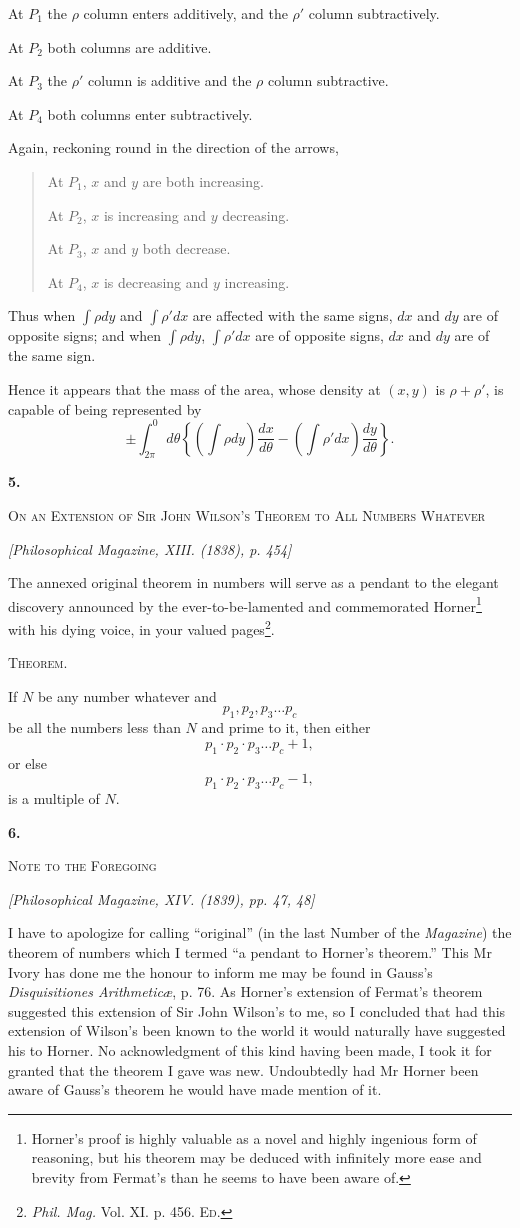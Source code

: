 \documentclass[11pt]{article}
\newcommand{\paperhead}[3]{%
  \clearpage
  \begin{center}
  {\Large\bfseries #1.}\par\vspace{0.85em}
  {\large\scshape #2}\par\vspace{0.6em}
  {\itshape [#3]}\par
  \end{center}\vspace{0.4em}}
\newcommand{\sourcepage}[1]{\marginpar{\scriptsize p.~#1}}
\begin{document}
At $P_1$ the $\rho$ column enters additively, and the $\rho'$ column subtractively.

At $P_2$ both columns are additive.

At $P_3$ the $\rho'$ column is additive and the $\rho$ column subtractive.

At $P_4$ both columns enter subtractively.

Again, reckoning round in the direction of the arrows,
\begin{quote}
At $P_1$, $x$ and $y$ are both increasing.\par
At $P_2$, $x$ is increasing and $y$ decreasing.\par
At $P_3$, $x$ and $y$ both decrease.\par
At $P_4$, $x$ is decreasing and $y$ increasing.
\end{quote}
Thus when $\int\rho dy$ and $\int\rho' dx$ are affected with the same signs, $dx$ and $dy$ are of opposite signs; and when $\int\rho dy$, $\int\rho' dx$ are of opposite signs, $dx$ and $dy$ are of the same sign.

Hence it appears that the mass of the area, whose density at $(x,y)$ is $\rho+\rho'$, is capable of being represented by
\[
\pm\int_{2\pi}^{0}d\theta\left\{\left(\int\rho dy\right)\frac{dx}{d\theta}-\left(\int\rho' dx\right)\frac{dy}{d\theta}\right\}.
\]

\paperhead{5}{On an Extension of Sir John Wilson's Theorem to All Numbers Whatever}{Philosophical Magazine, XIII. (1838), p. 454}
\sourcepage{39}
The annexed original theorem in numbers will serve as a pendant to the elegant discovery announced by the ever-to-be-lamented and commemorated Horner\footnote{Horner's proof is highly valuable as a novel and highly ingenious form of reasoning, but his theorem may be deduced with infinitely more ease and brevity from Fermat's than he seems to have been aware of.} with his dying voice, in your valued pages\footnote{\emph{Phil. Mag.} Vol. XI. p. 456. \textsc{Ed.}}.

\begin{center}\scshape Theorem.\end{center}

If $N$ be any number whatever and
\[
p_1,p_2,p_3\ldots p_c
\]
be all the numbers less than $N$ and prime to it, then either
\[
p_1\cdot p_2\cdot p_3\ldots p_c+1,
\]
or else
\[
p_1\cdot p_2\cdot p_3\ldots p_c-1,
\]
is a multiple of $N$.

\paperhead{6}{Note to the Foregoing}{Philosophical Magazine, XIV. (1839), pp. 47, 48}
\sourcepage{39}
I have to apologize for calling ``original'' (in the last Number of the \emph{Magazine}) the theorem of numbers which I termed ``a pendant to Horner's theorem.'' This Mr Ivory has done me the honour to inform me may be found in Gauss's \emph{Disquisitiones Arithmeticæ}, p. 76. As Horner's extension of Fermat's theorem suggested this extension of Sir John Wilson's to me, so I concluded that had this extension of Wilson's been known to the world it would naturally have suggested his to Horner. No acknowledgment of this kind having been made, I took it for granted that the theorem I gave was new. Undoubtedly had Mr Horner been aware of Gauss's theorem he would have made mention of it.
\end{document}
